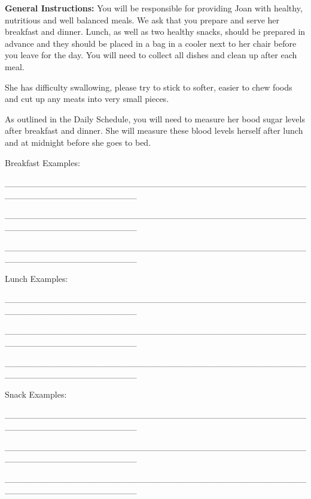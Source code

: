 \documentclass[]{article}
\begin{document}
\textbf{General Instructions:} You will be responsible for providing
Joan with healthy, nutritious and well balanced meals. We ask that you
prepare and serve her breakfast and dinner. Lunch, as well as two
healthy snacks, should be prepared in advance and they should be placed
in a bag in a cooler next to her chair before you leave for the day. You
will need to collect all dishes and clean up after each meal.

She has difficulty swallowing, please try to stick to softer, easier to
chew foods and cut up any meats into very small pieces.

As outlined in the Daily Schedule, you will need to measure her bood
sugar levels after breakfast and dinner. She will measure these blood
levels herself after lunch and at midnight before she goes to bed.

Breakfast Examples:

\_\_\_\_\_\_\_\_\_\_\_\_\_\_\_\_\_\_\_\_\_\_\_\_\_\_\_\_\_\_\_\_\_\_\_\_\_\_\_\_\_\_\_\_\_\_\_\_\_\_\_\_\_\_\_\_\_\_\_\_\_\_\_\_\_\_\_\_\_

\_\_\_\_\_\_\_\_\_\_\_\_\_\_\_\_\_\_\_\_\_\_\_\_\_\_\_\_\_\_\_\_\_\_\_\_\_\_\_\_\_\_\_\_\_\_\_\_\_\_\_\_\_\_\_\_\_\_\_\_\_\_\_\_\_\_\_\_\_

\_\_\_\_\_\_\_\_\_\_\_\_\_\_\_\_\_\_\_\_\_\_\_\_\_\_\_\_\_\_\_\_\_\_\_\_\_\_\_\_\_\_\_\_\_\_\_\_\_\_\_\_\_\_\_\_\_\_\_\_\_\_\_\_\_\_\_\_\_

Lunch Examples:

\_\_\_\_\_\_\_\_\_\_\_\_\_\_\_\_\_\_\_\_\_\_\_\_\_\_\_\_\_\_\_\_\_\_\_\_\_\_\_\_\_\_\_\_\_\_\_\_\_\_\_\_\_\_\_\_\_\_\_\_\_\_\_\_\_\_\_\_\_

\_\_\_\_\_\_\_\_\_\_\_\_\_\_\_\_\_\_\_\_\_\_\_\_\_\_\_\_\_\_\_\_\_\_\_\_\_\_\_\_\_\_\_\_\_\_\_\_\_\_\_\_\_\_\_\_\_\_\_\_\_\_\_\_\_\_\_\_\_

\_\_\_\_\_\_\_\_\_\_\_\_\_\_\_\_\_\_\_\_\_\_\_\_\_\_\_\_\_\_\_\_\_\_\_\_\_\_\_\_\_\_\_\_\_\_\_\_\_\_\_\_\_\_\_\_\_\_\_\_\_\_\_\_\_\_\_\_\_

Snack Examples:

\_\_\_\_\_\_\_\_\_\_\_\_\_\_\_\_\_\_\_\_\_\_\_\_\_\_\_\_\_\_\_\_\_\_\_\_\_\_\_\_\_\_\_\_\_\_\_\_\_\_\_\_\_\_\_\_\_\_\_\_\_\_\_\_\_\_\_\_\_

\_\_\_\_\_\_\_\_\_\_\_\_\_\_\_\_\_\_\_\_\_\_\_\_\_\_\_\_\_\_\_\_\_\_\_\_\_\_\_\_\_\_\_\_\_\_\_\_\_\_\_\_\_\_\_\_\_\_\_\_\_\_\_\_\_\_\_\_\_

\_\_\_\_\_\_\_\_\_\_\_\_\_\_\_\_\_\_\_\_\_\_\_\_\_\_\_\_\_\_\_\_\_\_\_\_\_\_\_\_\_\_\_\_\_\_\_\_\_\_\_\_\_\_\_\_\_\_\_\_\_\_\_\_\_\_\_\_\_
\end{document}
